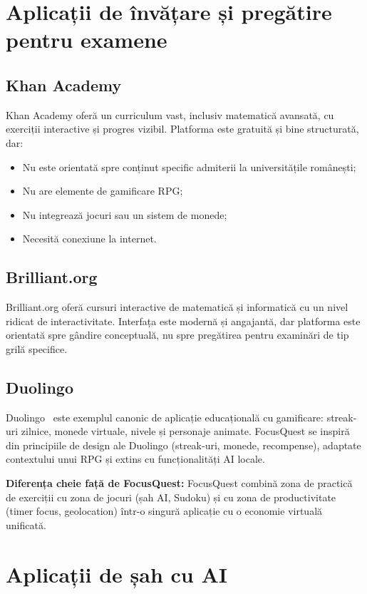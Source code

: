 \documentclass[12pt, a4paper, twoside]{report}
\numberwithin{equation}{section}
\begin{document}
\section{Aplicații de învățare și pregătire pentru examene}

\subsection{Khan Academy}

Khan Academy oferă un curriculum vast, inclusiv matematică avansată, cu exerciții
interactive și progres vizibil. Platforma este gratuită și bine structurată, dar:
\begin{itemize}
  \item Nu este orientată spre conținut specific admiterii la universitățile românești;
  \item Nu are elemente de gamificare RPG;
  \item Nu integrează jocuri sau un sistem de monede;
  \item Necesită conexiune la internet.
\end{itemize}

\subsection{Brilliant.org}

Brilliant.org oferă cursuri interactive de matematică și informatică cu un nivel ridicat de
interactivitate. Interfața este modernă și angajantă, dar platforma este orientată spre
gândire conceptuală, nu spre pregătirea pentru examinări de tip grilă specifice.

\subsection{Duolingo}

Duolingo~\cite{duolingo} este exemplul canonic de aplicație educațională cu gamificare: streak-uri zilnice,
monede virtuale, nivele și personaje animate. FocusQuest se inspiră din principiile de design
ale Duolingo (streak-uri, monede, recompense), adaptate contextului unui RPG și extins cu
funcționalități AI locale.

\textbf{Diferența cheie față de FocusQuest:} FocusQuest combină zona de practică de exerciții
cu zona de jocuri (șah AI, Sudoku) și cu zona de productivitate (timer focus, geolocation)
într-o singură aplicație cu o economie virtuală unificată.

\section{Aplicații de șah cu AI}
\end{document}
